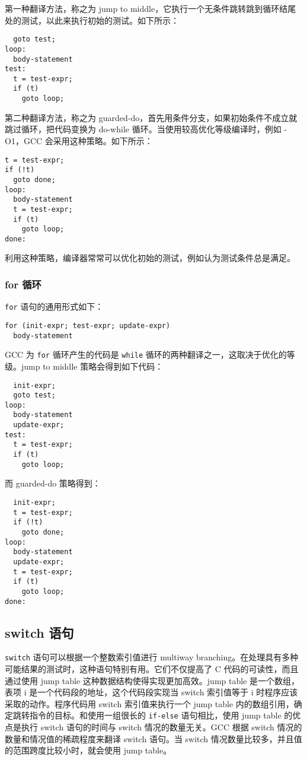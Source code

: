 第一种翻译方法，称之为 jump to middle，它执行一个无条件跳转跳到循环结尾处的测试，以此来执行初始的测试。如下所示：
\begin{verbatim}
  goto test;
loop:
  body-statement
test:
  t = test-expr;
  if (t)
    goto loop;
\end{verbatim}

第二种翻译方法，称之为 guarded-do，首先用条件分支，如果初始条件不成立就跳过循环，把代码变换为 do-while 循环。当使用较高优化等级编译时，例如 -O1，GCC 会采用这种策略。如下所示：
\begin{verbatim}
t = test-expr;
if (!t)
  goto done;
loop:
  body-statement
  t = test-expr;
  if (t)
    goto loop;
done:
\end{verbatim}
利用这种策略，编译器常常可以优化初始的测试，例如认为测试条件总是满足。

\subsubsection{for 循环}

\verb|for| 语句的通用形式如下：
\begin{verbatim}
for (init-expr; test-expr; update-expr)
  body-statement
\end{verbatim}

GCC 为 \verb|for| 循环产生的代码是 \verb|while| 循环的两种翻译之一，这取决于优化的等级。jump to middle 策略会得到如下代码：
\begin{verbatim}
  init-expr;
  goto test;
loop:
  body-statement
  update-expr;
test:
  t = test-expr;
  if (t)
    goto loop;
\end{verbatim}
而 guarded-do 策略得到：
\begin{verbatim}
  init-expr;
  t = test-expr;
  if (!t)
    goto done;
loop:
  body-statement
  update-expr;
  t = test-expr;
  if (t)
    goto loop;
done:
\end{verbatim}

\subsection{switch 语句}

\verb|switch| 语句可以根据一个整数索引值进行 multiway branching。在处理具有多种可能结果的测试时，这种语句特别有用。它们不仅提高了 C 代码的可读性，而且通过使用 jump table 这种数据结构使得实现更加高效。jump table 是一个数组，表项 i 是一个代码段的地址，这个代码段实现当 switch 索引值等于 i 时程序应该采取的动作。程序代码用 switch 索引值来执行一个 jump table 内的数组引用，确定跳转指令的目标。和使用一组很长的 \verb|if-else| 语句相比，使用 jump table 的优点是执行 switch 语句的时间与 switch 情况的数量无关。GCC 根据 switch 情况的数量和情况值的稀疏程度来翻译 switch 语句。当 switch 情况数量比较多，并且值的范围跨度比较小时，就会使用 jump table。

